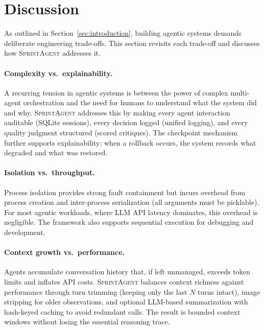 \documentclass[11pt, a4paper]{article}
\newcommand{\sprintagent}{\textsc{SprintAgent}}
\begin{document}
\section{Discussion}
\label{sec:discussion}

As outlined in Section~\ref{sec:introduction}, building agentic systems
demands deliberate engineering trade-offs.  This section revisits each
trade-off and discusses how \sprintagent{} addresses it.

\paragraph{Complexity vs.\ explainability.}
A recurring tension in agentic systems is between the power of complex
multi-agent orchestration and the need for humans to understand what the
system did and why.  \sprintagent{} addresses this by making every
agent interaction auditable (SQLite sessions), every decision logged
(unified logging), and every quality judgment structured (scored
critiques).  The checkpoint mechanism further supports explainability:
when a rollback occurs, the system records what degraded and what was
restored.

\paragraph{Isolation vs.\ throughput.}
Process isolation provides strong fault containment but incurs overhead
from process creation and inter-process serialization (all arguments
must be picklable).  For most agentic workloads, where LLM API latency
dominates, this overhead is negligible.  The framework also supports
sequential execution for debugging and development.

\paragraph{Context growth vs.\ performance.}
Agents accumulate conversation history that, if left unmanaged, exceeds
token limits and inflates API costs.  \sprintagent{} balances context
richness against performance through turn trimming (keeping only the
last $N$ turns intact), image stripping for older observations, and
optional LLM-based summarization with hash-keyed caching to avoid
redundant calls.  The result is bounded context windows without losing
the essential reasoning trace.
\end{document}
